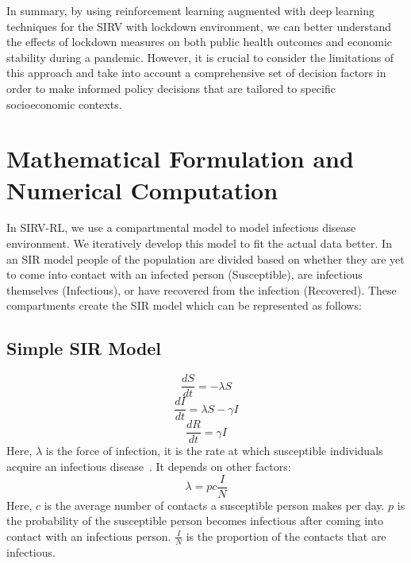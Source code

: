 \documentclass[tikz,fleqn,12pt]{wlscirep}
\begin{document}
In summary, by using reinforcement learning augmented with deep learning techniques for the SIRV with lockdown environment, we can better understand the effects of lockdown measures on both public health outcomes and economic stability during a pandemic. However, it is crucial to consider the limitations of this approach and take into account a comprehensive set of decision factors in order to make informed policy decisions that are tailored to specific socioeconomic contexts.

\section{Mathematical Formulation and Numerical Computation}
In SIRV-RL, we use a compartmental model to model infectious disease environment. We iteratively develop this model to fit the actual data better. In an SIR model people of the population are divided based on whether they are yet to come into contact with an infected person (Susceptible), are infectious themselves (Infectious), or have recovered from the infection (Recovered). These compartments create the SIR model which can be represented as follows:
\subsection{Simple SIR Model}
\begin{figure}[htbp!]
\centering    
{}
\end{figure}
\begin{equation}
  \frac{d S}{d t}=-\lambda S
  \label{eq:S_without_lockdown}
\end{equation}
\begin{equation}
  \frac{d I}{d t}=\lambda S-\gamma I
  \label{eq:I_without_lockdown}
\end{equation}
\begin{equation}
  \frac{d R}{d t}=\gamma I
  \label{eq:R_without_lockdown}
\end{equation}
Here, $\lambda$ is the force of infection, it is the rate at which susceptible individuals acquire an infectious disease~\cite{hens_aerts_faes_shkedy_lejeune_vandamme_beutels_2010}. It depends on other factors:
\begin{equation}
  \lambda = pc\frac{I}{N}
  \label{eq:lambda_force_of_infection}
\end{equation}
Here, $c$ is the average number of contacts a susceptible person makes per day. $p$ is the probability of the susceptible person becomes infectious after coming into contact with an infectious person. $\frac{I}{N}$ is the proportion of the contacts that are infectious.
\end{document}
